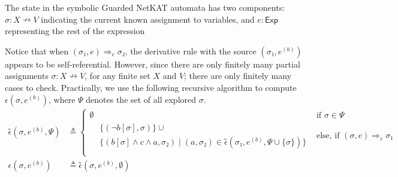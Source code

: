 \documentclass[manuscript,screen,review,anonymous]{acmart}
\newcommand{\true}{\mathrm{true}}
\newcommand{\command}[1]{\texttt{#1}}
\newcommand{\comAssert}[1]{\command{assert}~#1}
\newcommand{\comSkip}{\command{skip}}
\newcommand{\comDup}{\command{dup}}
\newcommand{\theoryOf}[1]{\ensuremath{\mathsf{#1}}}
\newcommand{\Exp}{\theoryOf{Exp}}
\newcommand\altxrightarrow[2][0pt]{\mathrel{\ensurestackMath{\stackengine%
  {\dimexpr#1-7.5pt}{\xrightarrow{\phantom{#2}}}{\scriptstyle\!#2\,}%
  {O}{c}{F}{F}{S}}}}
\newcommand{\transvia}[1]{
    \mathrel{\raisebox{-2px}{\(\altxrightarrow[-2px]{#1}\)}}
}
\newcommand{\transOut}[2]{⇒_{#1} #2}
\begin{document}
The state in the symbolic Guarded NetKAT automata has two components: \(σ: X ↛ V\) indicating the current known assignment to variables, and \(e: \Exp\) representing the rest of the expression
Notice that when \((σ₁, e) \transOut{c}{σ₂}\), the derivative rule with the source \((σ₁, e^{(b)})\) appears to be self-referential. 
However, since there are only finitely many partial assignments \(σ: X ↛ V\), for any finite set \(X\) and \(V\); there are only finitely many cases to check.
Practically, we use the following recursive algorithm to compute \(ϵ(σ, e^{(b)})\), where \(Ψ\) denotes the set of all explored \(σ\).
\begin{align*}
  ϵ̂(σ, e^{(b)}, Ψ) & ≜ \begin{cases}
    ∅ & \text{if } σ ∈ Ψ \\  
    \begin{aligned}
      & \{(¬b[σ], σ)\} ∪ \\
      & \{(b[σ] ∧ c ∧ a, σ₂) ∣ (a, σ₂) ∈ ϵ̂(σ₁, e^{(b)}, Ψ ∪ \{σ\})\}
    \end{aligned}
     & \text{else, if } (σ, e)\transOut{c}{σ₁}\\
  \end{cases}\\
  ϵ(σ, e^{(b)}) & ≜ ϵ̂(σ, e^{(b)}, ∅)
\end{align*}
\end{document}
